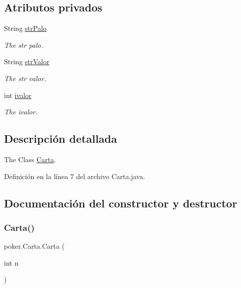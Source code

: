 \subsection*{Atributos privados}
\begin{DoxyCompactItemize}
\item 
String \mbox{\hyperlink{classpoker_1_1Carta_a819422a523ac0469a2cce6801bc9ee85}{str\+Palo}}
\begin{DoxyCompactList}\small\item\em The str palo. \end{DoxyCompactList}\item 
String \mbox{\hyperlink{classpoker_1_1Carta_ad6f9ce08abdee20380c2fcd176fedc58}{str\+Valor}}
\begin{DoxyCompactList}\small\item\em The str valor. \end{DoxyCompactList}\item 
int \mbox{\hyperlink{classpoker_1_1Carta_ac4748f23289d9b1bfc87e3899b656d8d}{ivalor}}
\begin{DoxyCompactList}\small\item\em The ivalor. \end{DoxyCompactList}\end{DoxyCompactItemize}


\subsection{Descripción detallada}
The Class \mbox{\hyperlink{classpoker_1_1Carta}{Carta}}. 

Definición en la línea 7 del archivo Carta.\+java.



\subsection{Documentación del constructor y destructor}
\mbox{\label{classpoker_1_1Carta_a6c938fe144f69fc14694f763781019e0}} 
\subsubsection{\texorpdfstring{Carta()}{Carta()}}
{\footnotesize\ttfamily poker.\+Carta.\+Carta (\begin{DoxyParamCaption}\item[{int}]{n }\end{DoxyParamCaption})}




